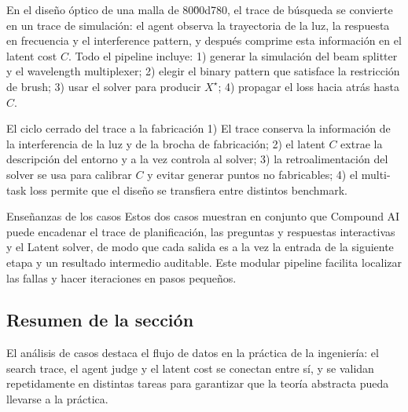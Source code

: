 En el diseño óptico de una malla de 80\u00d780, el trace de búsqueda se convierte en un trace de simulación: el agent observa la trayectoria de la luz, la respuesta en frecuencia y el interference pattern, y después comprime esta información en el latent cost \(C\). Todo el pipeline incluye: 1) generar la simulación del beam splitter y el wavelength multiplexer; 2) elegir el binary pattern que satisface la restricción de brush; 3) usar el solver para producir \(X^\star\); 4) propagar el loss hacia atrás hasta \(C\).
\begin{importantbox}{El ciclo cerrado del trace a la fabricación}
1) El trace conserva la información de la interferencia de la luz y de la brocha de fabricación; 2) el latent \(C\) extrae la descripción del entorno y a la vez controla al solver; 3) la retroalimentación del solver se usa para calibrar \(C\) y evitar generar puntos no fabricables; 4) el multi-task loss permite que el diseño se transfiera entre distintos benchmark.
\end{importantbox}
\begin{knowledgebox}{Enseñanzas de los casos}
Estos dos casos muestran en conjunto que Compound AI puede encadenar el trace de planificación, las preguntas y respuestas interactivas y el Latent solver, de modo que cada salida es a la vez la entrada de la siguiente etapa y un resultado intermedio auditable. Este modular pipeline facilita localizar las fallas y hacer iteraciones en pasos pequeños.
\end{knowledgebox}

\subsection{Resumen de la sección}

El análisis de casos destaca el flujo de datos en la práctica de la ingeniería: el search trace, el agent judge y el latent cost se conectan entre sí, y se validan repetidamente en distintas tareas para garantizar que la teoría abstracta pueda llevarse a la práctica.

